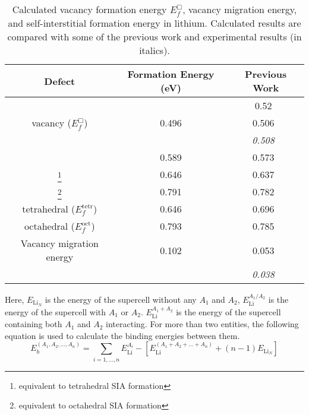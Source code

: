 \begin{table}
\caption[Defect formation energies in bcc lithium]{Calculated vacancy formation energy $E_f^{\Box}$, vacancy migration energy, and self-interstitial formation energy in lithium. Calculated results are compared with some of the previous work and experimental results (in italics).}
\label{tab:lidmble}
\centering
\begin{minipage}{28.5em}
\let\footnoterule\relax
\begin{tabular}{c c c} \toprule
Defect					& Formation Energy (eV)						& Previous Work \\ \midrule
						&											& 0.52~\cite{frank1996first} \\ 
vacancy ($E_f^{\Box}$)	& 0.496										& 0.506~\cite{ma2019effect} \\
						&										& \textit{0.508}~\cite{LandoltBornstein1991} \\ \hline
{}			   & 0.589										&  0.573~\cite{ma2019}	 \\ \hline
{}\footnote{equivalent to tetrahedral SIA formation}   & 0.646 & 0.637~\cite{ma2019}	 \\ \hline
{}\footnote{equivalent to octahedral SIA formation}   & 0.791 &  0.782~\cite{ma2019}    \\ \hline
tetrahedral ($E_f^{\text{tetr}}$) &	0.646 &	0.696~\cite{ma2019}	\\ \hline
octahedral ($E_f^{\text{oct}}$) & 0.793	& 0.785~\cite{ma2019}	\\ \hline
Vacancy migration energy       & 0.102 & 0.053~\cite{ma2019effect}	\\ 
							   &       & \textit{0.038}~\cite{LandoltBornstein1991} \\ 
\bottomrule
\end{tabular}
\end{minipage}
\end{table}


Here, $E_{\text{Li}_N}$ is the energy of the supercell without any $A_1$ and $A_2$, $E^{A_1/A_2}_{\text{Li}}$ is the energy of the supercell with $A_1$ or $A_2$. $E_{\text{Li}}^{A_1+A_2}$ is the energy of the supercell containing both $A_1$ and $A_2$ interacting.  For more than two entities, the following equation is used to calculate the binding energies between them.
\begin{equation}
E_b^{(A_1,A_2,\dots,A_n)} = \sum_{i=1,\dots,n} E^{A_i}_{\text{Li}} - \left[ E^{(A_1 + A_2 + \dots + A_n)}_{\text{Li}} + (n-1)E_{\text{Li}_N} \right ]
\end{equation}


